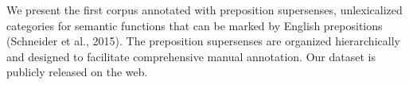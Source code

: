 We present the first corpus annotated with preposition supersenses, unlexicalized categories for semantic functions that can be marked by English prepositions (Schneider et al., 2015). The preposition supersenses are organized hierarchically and designed to facilitate comprehensive manual annotation. Our dataset is publicly released on the web.
